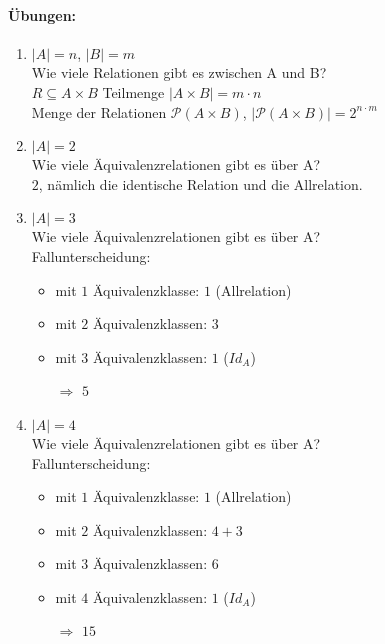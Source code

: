 \paragraph{Übungen:}
\begin{enumerate}
\item $|A|=n$, $|B|=m$\\
Wie viele Relationen gibt es zwischen A und B?
\ \\
$R\subseteq A \times B$ Teilmenge $|A \times B| = m \cdot n$\\
Menge der Relationen $\mathcal{P}(A\times B)$, $|\mathcal{P}(A\times B)|=2^{n\cdot m}$
\item $|A|=2$\\
Wie viele Äquivalenzrelationen gibt es über A?
\ \\
$2$, nämlich die identische Relation und die Allrelation.
\item $|A|=3$\\
Wie viele Äquivalenzrelationen gibt es über A?
\ \\
Fallunterscheidung:
\begin{itemize}
\item mit $1$ Äquivalenzklasse: $1$ (Allrelation)
\item mit $2$ Äquivalenzklassen: $3$
\item mit $3$ Äquivalenzklassen: $1$ ($Id_A$)
\item[$\Rightarrow$] $5$
\end{itemize}
\item $|A|=4$\\
Wie viele Äquivalenzrelationen gibt es über A?
\ \\
Fallunterscheidung:
\begin{itemize}
\item mit $1$ Äquivalenzklasse: $1$ (Allrelation)
\item mit $2$ Äquivalenzklassen: $4+3$
\item mit $3$ Äquivalenzklassen: $6$
\item mit $4$ Äquivalenzklassen: $1$ ($Id_A$)
\item[$\Rightarrow$] $15$
\end{itemize}
\end{enumerate}

